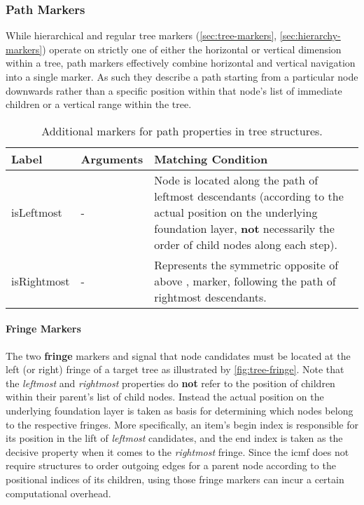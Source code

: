 \documentclass[11pt,a4paper]{article}
\begin{document}
\subsubsection{Path Markers}
\label{sec:path-markers}

While hierarchical and regular tree markers (\ref{sec:tree-markers}, \ref{sec:hierarchy-markers}) operate on strictly one of either the horizontal or vertical dimension within a tree, path markers effectively combine horizontal and vertical navigation into a single marker.
As such they describe a path starting from a particular node downwards rather than a specific position within that node's list of immediate children or a vertical range within the tree.

\begin{table}[!htb]\centering
	\begin{tabular}{|p{}|p{}|p{}|}
		\hline 
		\textbf{Label} & \textbf{Arguments} & \textbf{Matching Condition} \\ 
		\hline 
		\hline 
		isLeftmost & - & Node is located along the path of leftmost descendants (according to the actual position on the underlying foundation layer, \textbf{not} necessarily the order of child nodes along each step). \\  
		\hline 
		isRightmost & - & Represents the symmetric opposite of above \query{isLeftmost}, marker, following the path of rightmost descendants. \\  
		\hline 
	\end{tabular}
	\caption[Path markers]{Additional markers for path properties in tree structures.}
	\label{tab:tree-path-markers}
\end{table}

\paragraph{Fringe Markers}
\noindent The two \textbf{fringe} markers  and  signal that node candidates must be located at the left (or right) fringe of a target tree as illustrated by \cref{fig:tree-fringe}.
Note that the \textit{leftmost} and \textit{rightmost} properties do \textbf{not} refer to the position of children within their parent's list of child nodes.
Instead the actual position on the underlying foundation layer is taken as basis for determining which nodes belong to the respective fringes.
More specifically, an item's begin index is responsible for its position in the lift of \textit{leftmost} candidates, and the end index is taken as the decisive property when it comes to the \textit{rightmost} fringe.
Since the \ac{icmf} does not require structures to order outgoing edges for a parent node according to the positional indices of its children, using those fringe markers can incur a certain computational overhead.
\end{document}
